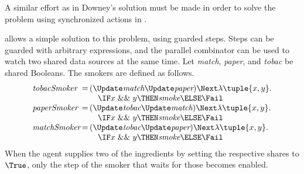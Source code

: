 A similar effort as in Downey's solution must be made in order to solve the problem using synchronized actions in \CSP.

\TOP allows a simple solution to this problem, using guarded steps.
Steps can be guarded with arbitrary expressions, and the parallel combinator can be used to watch two shared data sources at the same time.
Let \textit{match}, \textit{paper}, and \textit{tobac} be shared Booleans.
The smokers are defined as follows.
\begin{equation*}
\begin{array}{l @{\,} c @{\,} l}
  \textit{tobacSmoker} & = & (\Update \textit{match} \And \Update \textit{paper}) \Next \lambda \tuple{x,y}. \\
    & & \quad \IF x \mathrel{\&\&} y \THEN \textit{smoke} \ELSE \Fail \\
  \textit{paperSmoker} & = & (\Update \textit{tobac} \And \Update \textit{match}) \Next \lambda \tuple{x,y}. \\
    & & \quad \IF x \mathrel{\&\&} y \THEN \textit{smoke} \ELSE \Fail \\
  \textit{matchSmoker} & = & (\Update \textit{tobac} \And \Update \textit{paper}) \Next \lambda \tuple{x,y}. \\
    & & \quad \IF x \mathrel{\&\&} y \THEN \textit{smoke} \ELSE \Fail \\
\end{array}
\end{equation*}
When the agent supplies two of the ingredients by setting the respective shares to $\True$, only the step of the smoker that waits for those becomes enabled.
